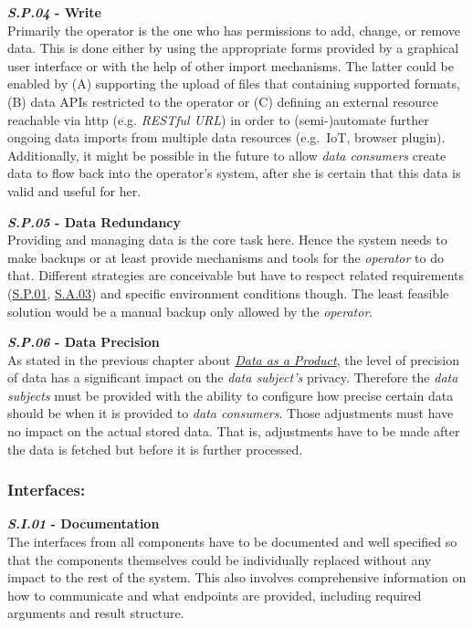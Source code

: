 \documentclass[12pt,english,a4paper,titlepage,cleardoublepage=empty,dottedtoc]{report}
\begin{document}
\textbf{\emph{\protect\hypertarget{sp04}{}{S.P.04}} - Write}\\
Primarily the operator is the one who has permissions to add, change, or
remove data. This is done either by using the appropriate forms provided
by a graphical user interface or with the help of other import
mechanisms. The latter could be enabled by (A) supporting the upload of
files that containing supported formats, (B) data APIs restricted to the
operator or (C) defining an external resource reachable via http (e.g.
\emph{RESTful URL}) in order to (semi-)automate further ongoing data
imports from multiple data resources (e.g.~IoT, browser plugin).
Additionally, it might be possible in the future to allow \emph{data
consumers} create data to flow back into the operator's system, after
she is certain that this data is valid and useful for her.

\textbf{\emph{\protect\hypertarget{sp05}{}{S.P.05}} - Data Redundancy}\\
Providing and managing data is the core task here. Hence the system
needs to make backups or at least provide mechanisms and tools for the
\emph{operator} to do that. Different strategies are conceivable but
have to respect related requirements (\protect\hyperlink{sp01}{S.P.01},
\protect\hyperlink{sa03}{S.A.03}) and specific environment conditions
though. The least feasible solution would be a manual backup only
allowed by the \emph{operator}.

\textbf{\emph{\protect\hypertarget{sp06}{}{S.P.06}} - Data Precision}\\
As stated in the previous chapter about
\emph{\protect\hyperlink{personal-data-as-a-product}{Data as a
Product}}, the level of precision of data has a significant impact on
the \emph{data subject's} privacy. Therefore the \emph{data subjects}
must be provided with the ability to configure how precise certain data
should be when it is provided to \emph{data consumers}. Those
adjustments must have no impact on the actual stored data. That is,
adjustments have to be made after the data is fetched but before it is
further processed.

\subsubsection*{Interfaces:}\label{interfaces}

\textbf{\emph{\protect\hypertarget{si01}{}{S.I.01}} - Documentation}\\
The interfaces from all components have to be documented and well
specified so that the components themselves could be individually
replaced without any impact to the rest of the system. This also
involves comprehensive information on how to communicate and what
endpoints are provided, including required arguments and result
structure.
\end{document}
